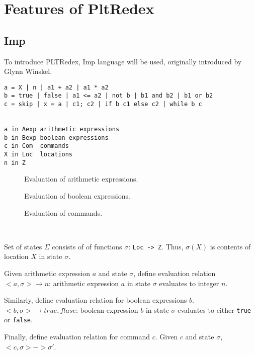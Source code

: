 \chapter{Features of PltRedex}

\section{Imp}

To introduce PLTRedex, Imp language will be used, originally introduced by Glynn Winskel.

\begin{lstlisting}
a = X | n | a1 + a2 | a1 * a2
b = true | false | a1 <= a2 | not b | b1 and b2 | b1 or b2
c = skip | x = a | c1; c2 | if b c1 else c2 | while b c


a in Aexp arithmetic expressions
b in Bexp boolean expressions
c in Com  commands 
X in Loc  locations
n in Z
\end{lstlisting}

\begin{figure}[h]

\caption{Evaluation of arithmetic expressions.}
\end{figure}

\begin{figure}[h]

\caption{Evaluation of boolean expressions.}
\end{figure}

\begin{figure}[h]

\caption{Evaluation of commands.}
\end{figure}



~\cite{plotkin}


Set of states $\Sigma$ consists of of functions $\sigma$: \texttt{Loc -> Z}. Thus, $\sigma(X)$ is contents of location $X$ in state $\sigma$. 

Given arithmetic expression $a$ and state $\sigma$, define evaluation relation $<a,\sigma> \rightarrow n$: arithmetic expression $a$ in state $\sigma$ evaluates to integer $n$.

Similarly, define evaluation relation for boolean expressions $b$. $<b, \sigma> \rightarrow {true, flase}$: boolean expression $b$ in state $\sigma$ evaluates to either \texttt{true} or \texttt{false}.

Finally, define evaluation relation for command $c$. Given $c$ and state $\sigma$, $<c, \sigma> -> \sigma\prime$. 

